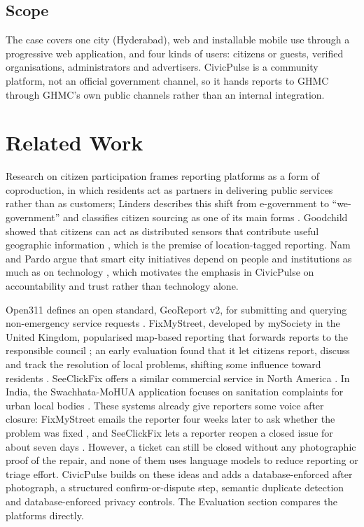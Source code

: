\documentclass[conference]{IEEEtran}
\begin{document}
\subsection{Scope}
The case covers one city (Hyderabad), web and installable mobile use through a progressive web application, and four kinds of users: citizens or guests, verified organisations, administrators and advertisers. CivicPulse is a community platform, not an official government channel, so it hands reports to GHMC through GHMC's own public channels rather than an internal integration.

\section{Related Work}
Research on citizen participation frames reporting platforms as a form of coproduction, in which residents act as partners in delivering public services rather than as customers; Linders describes this shift from e-government to ``we-government'' and classifies citizen sourcing as one of its main forms \cite{b1}. Goodchild showed that citizens can act as distributed sensors that contribute useful geographic information \cite{b2}, which is the premise of location-tagged reporting. Nam and Pardo argue that smart city initiatives depend on people and institutions as much as on technology \cite{b3}, which motivates the emphasis in CivicPulse on accountability and trust rather than technology alone.

Open311 defines an open standard, GeoReport v2, for submitting and querying non-emergency service requests \cite{b4}. FixMyStreet, developed by mySociety in the United Kingdom, popularised map-based reporting that forwards reports to the responsible council \cite{b5}; an early evaluation found that it let citizens report, discuss and track the resolution of local problems, shifting some influence toward residents \cite{b6}. SeeClickFix offers a similar commercial service in North America \cite{b7}. In India, the Swachhata-MoHUA application focuses on sanitation complaints for urban local bodies \cite{b8}. These systems already give reporters some voice after closure: FixMyStreet emails the reporter four weeks later to ask whether the problem was fixed \cite{b9}, and SeeClickFix lets a reporter reopen a closed issue for about seven days \cite{b10}. However, a ticket can still be closed without any photographic proof of the repair, and none of them uses language models to reduce reporting or triage effort. CivicPulse builds on these ideas and adds a database-enforced after photograph, a structured confirm-or-dispute step, semantic duplicate detection and database-enforced privacy controls. The Evaluation section compares the platforms directly.
\end{document}
